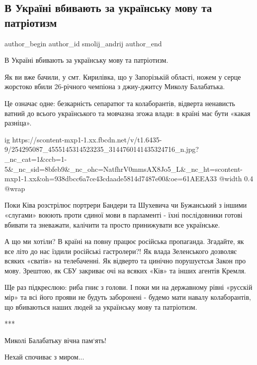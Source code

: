  
 
 
 
 
 
\subsection{В Україні вбивають за українську мову та патріотизм}
\label{sec:07_11_2021.fb.smolij_andrij.1.balabatjko_ubijstvo_mova}
 
\ifcmt
 author_begin
   author_id smolij_andrij
 author_end
\fi

В Україні вбивають за українську мову та патріотизм. 

Як ви вже бачили, у смт. Кирилівка, що у Запорізькій області, ножем у серце
жорстоко вбили 26-річного чемпіона з джиу-джитсу Миколу Балабатька. 

Це означає одне: безкарність сепаратюг та колаборантів, відверта ненависть
ватний до всього українського та мовчазна згожа влади: в країні має бути «какая
разніца». 

\ifcmt
  ig https://scontent-mxp1-1.xx.fbcdn.net/v/t1.6435-9/254295087_4555145314523235_3144760141435324716_n.jpg?_nc_cat=1&ccb=1-5&_nc_sid=8bfeb9&_nc_ohc=NatfhrV0mmsAX8Jo5_L&_nc_ht=scontent-mxp1-1.xx&oh=938dbcc6a7ce43cdaade5814d7487e00&oe=61AEEA33
  @width 0.4
  @wrap 
\fi

Поки Ківа розстрілює портрери Бандери та Шухевича чи Бужанський з іншими
«слугами» воюють проти єдиної мови в парламенті - їхні послідовники готові
вбивати та зневажати, калічити та просто принижувати все українське.

А що ми хотіли? В країні на повну працює російська пропаганда. Згадайте, як все
літо до нас їздили російські гастролери?! Як влада Зеленського дозволяє всяких
«сватів» на телебаченні. Як відверто та цинічно порушуєтсья Закон про мову.
Зрештою, як СБУ закриває очі на всяких «Ків» та інших агентів Кремля.

Ще раз підкреслюю: риба гниє з голови. І поки ми на державному рівні «русскій
мір» та всі його прояви не будуть заборонені - будемо мати навалу колаборантів,
що вбиваються наших людей за українську мову та патріотизм. 

***

Миколі Балабатьку вічна пам‘ять! 

Нехай спочиває з миром...

